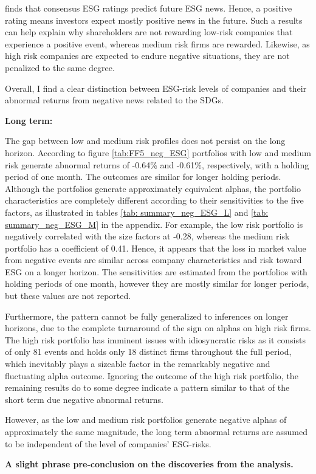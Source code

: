 \cite{serafeim2022stock} finds that consensus ESG ratings predict future ESG news. Hence, a positive rating means investors expect mostly positive news in the future. Such a results can help explain why shareholders are not rewarding low-risk companies that experience a positive event, whereas medium risk firms are rewarded. Likewise, as high risk companies are expected to endure negative situations, they are not penalized to the same degree.  


Overall, I find a clear distinction between ESG-risk levels of companies and their abnormal returns from negative news related to the SDGs. 

\textbf{Long term:}

The gap between low and medium risk profiles does not persist on the long horizon. According to figure \ref{tab:FF5_neg_ESG} portfolios with low and medium risk generate abnormal returns of -0.64\% and -0.61\%, respectively, with a holding period of one month. The outcomes are similar for longer holding periods. 
Although the portfolios generate approximately equivalent alphas, the portfolio characteristics are completely different according to their sensitivities to the five factors, as illustrated in tables \ref{tab: summary_neg_ESG_L} and \ref{tab: summary_neg_ESG_M} in the appendix. For example, the low risk portfolio is negatively correlated with the size factors at -0.28, whereas the medium risk portfolio has a coefficient of 0.41. Hence, it appears that the loss in market value from negative events are similar across company characteristics and risk toward ESG on a longer horizon. The sensitivities are estimated from the portfolios with holding periods of one month, however they are mostly similar for longer periods, but these values are not reported. 

Furthermore, the pattern cannot be fully generalized to inferences on longer horizons, due to the complete turnaround of the sign on alphas on high risk firms. The high risk portfolio has imminent issues with idiosyncratic risks as it consists of only 81 events and holds only 18 distinct firms throughout the full period, which inevitably plays a sizeable factor in the remarkably negative and fluctuating alpha outcome. Ignoring the outcome of the high risk portfolio, the remaining results do to some degree indicate a pattern similar to that of the short term due negative abnormal returns.

However, as the low and medium risk portfolios generate negative alphas of approximately the same magnitude, the long term abnormal returns are assumed to be independent of the level of companies' ESG-risks. 


\textbf{A slight phrase pre-conclusion on the discoveries from the analysis.}